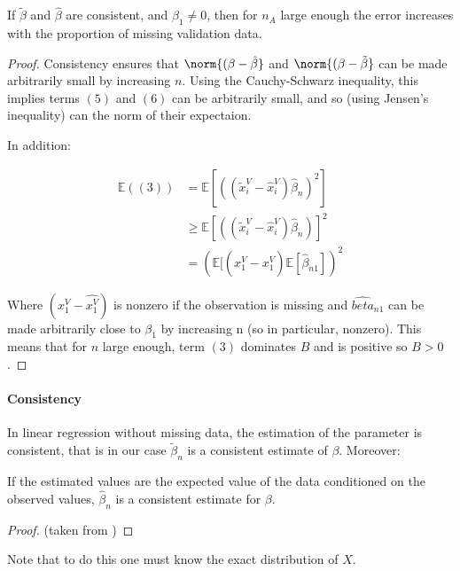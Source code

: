 \begin{proposition}
\label{prop.increase}
If $\tilde{\beta}$ and $\hat{\beta}$ are consistent, and $\beta_1 \neq 0$, then for $n_A$ large enough the error increases with the proportion of missing validation data.
\end{proposition} 
\begin{proof}
Consistency ensures that $\norm{(\beta-\hat{\beta}}$ and $\norm{(\beta-\tilde{\beta}}$ can be made arbitrarily small by increasing $n$. Using the Cauchy-Schwarz inequality, this implies terms $(5)$ and $(6)$ can be arbitrarily small, and so (using Jensen's inequality) can the norm of their expectaion.

In addition:

\begin{align*}
\mathbb{E}((3)) &=\mathbb{E}[((\tilde{x}_i^V - \hat{x}_i^V) \hat{\beta}_n)^2] \\ 	
			&\ge  \mathbb{E}[((\tilde{x}_i^V - \hat{x}_i^V) \hat{\beta}_n)]^2 \\
			&=  (\mathbb{E}[(x_1^V - \hat{x_1^V})\mathbb{E}[\hat{\beta}_{n1}])^2
\end{align*}

Where $(x_1^V - \hat{x_1^V})$ is nonzero if the observation is missing and $\hat{beta}_{n1}$ can be made arbitrarily close to $\beta_1$ by increasing n (so in particular, nonzero). This means that for $n$ large enough, term $(3)$ dominates $B$ and is positive so $B >0$.
\end{proof}

\paragraph{Consistency}
In linear regression without missing data, the estimation of the parameter is consistent\cite{consistency_linreg}, that is in our case $\tilde{\beta}_n$ is a consistent estimate of $\beta$. Moreover:

\begin{proposition}
If the estimated values are the expected value of the data conditioned on the observed values, $\hat{\beta}_n$ is a consistent estimate for $\beta$.
\end{proposition}
\begin{proof}
(taken from \cite{little1992missingX})
\end{proof}

Note that to do this one must know the exact distribution of $X$.

